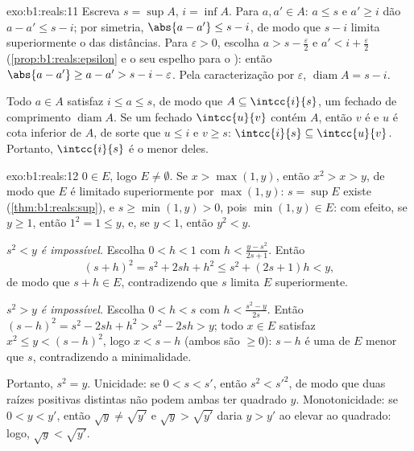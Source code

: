 \begin{solution}{exo:b1:reals:11}
Escreva $s = \sup A$, $i = \inf A$. Para $a, a' \in A$: $a \leq s$
e $a' \geq i$ dão $a - a' \leq s - i$; por simetria, $\abs{a -
a'} \leq s - i$, de modo que $s - i$ limita superiormente o  das
distâncias. Para $\varepsilon > 0$, escolha $a > s - \frac\varepsilon2$ e $a' < i
+ \frac\varepsilon2$ (\cref{prop:b1:reals:epsilon} e o seu espelho
para o ): então $\abs{a - a'} \geq a - a' > s - i -
\varepsilon$. Pela caracterização por $\varepsilon$,
$\operatorname{diam} A = s - i$.

Todo $a \in A$ satisfaz $i \leq a \leq s$, de modo que $A \subseteq
\intcc{i}{s}$, um  fechado de comprimento $\operatorname{diam}
A$. Se um  fechado $\intcc{u}{v}$ contém $A$, então $v$ é
 e $u$ é cota inferior de $A$, de sorte que $u \leq i$ e $v
\geq s$: $\intcc{i}{s} \subseteq \intcc{u}{v}$. Portanto,
$\intcc{i}{s}$ é o menor deles.
\end{solution}

\begin{solution}{exo:b1:reals:12}
$0 \in E$, logo $E \neq \emptyset$. Se $x > \max(1, y)$, então $x^2 >
x > y$, de modo que $E$ é limitado superiormente por $\max(1, y)$: $s = \sup E$
existe (\cref{thm:b1:reals:sup}), e $s \geq \min(1, y) > 0$,
pois $\min(1, y) \in E$: com efeito, se $y \geq 1$, então $1^2 = 1
\leq y$, e, se $y < 1$, então $y^2 < y$.

\emph{$s^2 < y$ é impossível.} Escolha $0 < h < 1$ com $h <
\frac{y - s^2}{2s + 1}$. Então
\[
(s + h)^2 = s^2 + 2sh + h^2 \leq s^2 + (2s + 1)h < y ,
\]
de modo que $s + h \in E$, contradizendo que $s$ limita $E$ superiormente.

\emph{$s^2 > y$ é impossível.} Escolha $0 < h < s$ com $h <
\frac{s^2 - y}{2s}$. Então $(s - h)^2 = s^2 - 2sh + h^2 > s^2 -
2sh > y$; todo $x \in E$ satisfaz $x^2 \leq y < (s - h)^2$,
logo $x < s - h$ (ambos são $\geq 0$): $s - h$ é uma 
de $E$ menor que $s$, contradizendo a minimalidade.

Portanto, $s^2 = y$. Unicidade: se $0 < s < s'$, então $s^2 <
s'^2$, de modo que duas raízes positivas distintas não podem ambas
ter quadrado $y$. Monotonicidade: se $0 < y < y'$, então $\sqrt y \neq \sqrt{y'}$ e
$\sqrt y > \sqrt{y'}$ daria $y > y'$ ao elevar ao quadrado: logo, $\sqrt
y < \sqrt{y'}$.
\end{solution}

